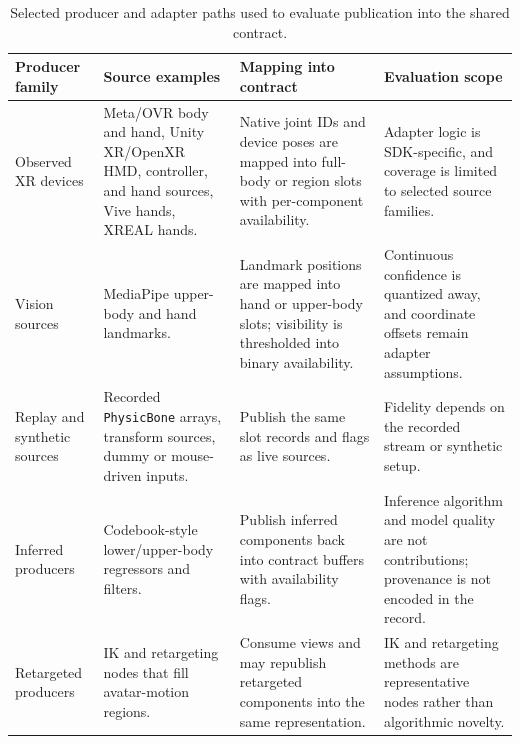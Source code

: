 \documentclass[runningheads]{llncs}
\begin{document}
\begin{table}[t]
	\caption{Selected producer and adapter paths used to evaluate publication into the shared contract.}\label{tab:producers}
	\centering
	\scriptsize
	\begin{tabular}{@{}P{24mm}P{25mm}P{35mm}P{35mm}@{}}
		\toprule
		Producer family              & Source examples                                                                                     & Mapping into contract                                                                                            & Evaluation scope                                                                                      \\
		\midrule
		Observed XR devices          & Meta/OVR body and hand, Unity XR/OpenXR HMD, controller, and hand sources, Vive hands, XREAL hands. & Native joint IDs and device poses are mapped into full-body or region slots with per-component availability.     & Adapter logic is SDK-specific, and coverage is limited to selected source families.                   \\
		Vision sources               & MediaPipe upper-body and hand landmarks.                                                            & Landmark positions are mapped into hand or upper-body slots; visibility is thresholded into binary availability. & Continuous confidence is quantized away, and coordinate offsets remain adapter assumptions.           \\
		Replay and synthetic sources & Recorded \texttt{PhysicBone} arrays, transform sources, dummy or mouse-driven inputs.               & Publish the same slot records and flags as live sources.                                                         & Fidelity depends on the recorded stream or synthetic setup.                                           \\
		Inferred producers           & Codebook-style lower/upper-body regressors and filters.                                             & Publish inferred components back into contract buffers with availability flags.                                  & Inference algorithm and model quality are not contributions; provenance is not encoded in the record. \\
		Retargeted producers         & IK and retargeting nodes that fill avatar-motion regions.                                           & Consume views and may republish retargeted components into the same representation.                              & IK and retargeting methods are representative nodes rather than algorithmic novelty.                  \\
		\bottomrule
	\end{tabular}
\end{table}
\end{document}

